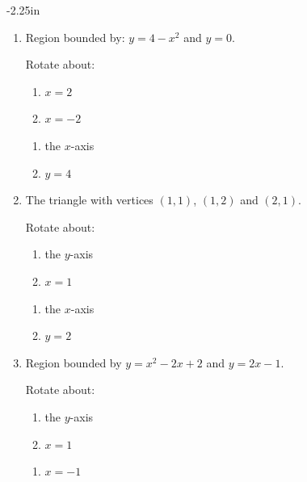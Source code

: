 \begin{adjustwidth*}{}{-2.25in}
\begin{multicols*}{2}
\begin{enumerate}[1),resume]
\item Region bounded by: $y=4-x^2$ and $y=0$.

Rotate about:

\noindent%
\begin{minipage}[t]{.5\linewidth}
\begin{enumerate}
\item		$x=2$
\item		$x=-2$
\end{enumerate}
\end{minipage}
\begin{minipage}[t]{.5\linewidth}
\begin{enumerate}\addtocounter{enumii}{2}
\item		the $x$-axis
\item		$y=4$
\end{enumerate}
\end{minipage}

\item The triangle with vertices $(1,1)$, $(1,2)$ and $(2,1)$.

Rotate about:

\noindent%
\begin{minipage}[t]{.5\linewidth}
\begin{enumerate}
\item		the $y$-axis
\item		$x=1$
\end{enumerate}
\end{minipage}
\begin{minipage}[t]{.5\linewidth}
\begin{enumerate}\addtocounter{enumii}{2}
\item		the $x$-axis
\item		$y=2$
\end{enumerate}
\end{minipage}

\item Region bounded by $y=x^2-2x+2$ and $y=2x-1$.

Rotate about:

\noindent%
\begin{minipage}[t]{.5\linewidth}
\begin{enumerate}
\item		the $y$-axis
\item		$x=1$
\end{enumerate}
\end{minipage}
\begin{minipage}[t]{.5\linewidth}
\begin{enumerate}\addtocounter{enumii}{2}
\item		$x=-1$
\end{enumerate}
\end{minipage}


\end{enumerate}
\end{multicols*}
\end{adjustwidth*}
